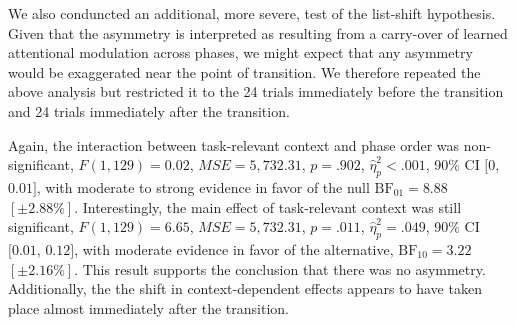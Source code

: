 \documentclass[english,,man,floatsintext]{apa6}
\begin{document}
We also conduncted an additional, more severe, test of the list-shift hypothesis. Given that the asymmetry is interpreted as resulting from a carry-over of learned attentional modulation across phases, we might expect that any asymmetry would be exaggerated near the point of transition. We therefore repeated the above analysis but restricted it to the 24 trials immediately before the transition and 24 trials immediately after the transition.

Again, the interaction between task-relevant context and phase order was non-significant, \(F(1, 129) = 0.02\), \(\mathit{MSE} = 5,732.31\), \(p = .902\), \(\hat{\eta}^2_p < .001\), 90\% CI \([0\), \(0.01]\), with moderate to strong evidence in favor of the null \(\mathrm{BF}_{\textrm{01}} = 8.88\) \([\pm 2.88\%]\). Interestingly, the main effect of task-relevant context was still significant, \(F(1, 129) = 6.65\), \(\mathit{MSE} = 5,732.31\), \(p = .011\), \(\hat{\eta}^2_p = .049\), 90\% CI \([0.01\), \(0.12]\), with moderate evidence in favor of the alternative, \(\mathrm{BF}_{\textrm{10}} = 3.22\) \([\pm 2.16\%]\). This result supports the conclusion that there was no asymmetry. Additionally, the the shift in context-dependent effects appears to have taken place almost immediately after the transition.
\end{document}
